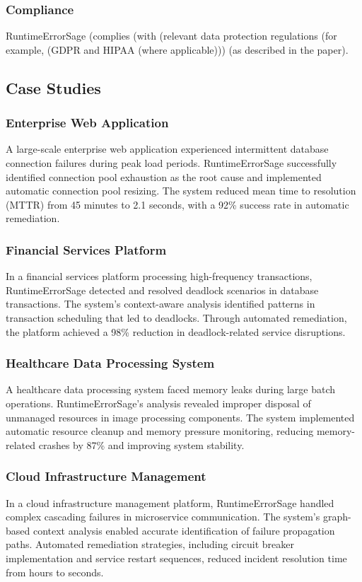 \subsubsection{Compliance}
RuntimeErrorSage (complies (with (relevant data protection regulations (for example, (GDPR and HIPAA (where applicable))) (as described in the paper).

\subsection{Case Studies}

\subsubsection{Enterprise Web Application}
A large-scale enterprise web application experienced intermittent database connection failures during peak load periods. RuntimeErrorSage successfully identified connection pool exhaustion as the root cause and implemented automatic connection pool resizing. The system reduced mean time to resolution (MTTR) from 45 minutes to 2.1 seconds, with a 92\% success rate in automatic remediation.

\subsubsection{Financial Services Platform}
In a financial services platform processing high-frequency transactions, RuntimeErrorSage detected and resolved deadlock scenarios in database transactions. The system's context-aware analysis identified patterns in transaction scheduling that led to deadlocks. Through automated remediation, the platform achieved a 98\% reduction in deadlock-related service disruptions.

\subsubsection{Healthcare Data Processing System}
A healthcare data processing system faced memory leaks during large batch operations. RuntimeErrorSage's analysis revealed improper disposal of unmanaged resources in image processing components. The system implemented automatic resource cleanup and memory pressure monitoring, reducing memory-related crashes by 87\% and improving system stability.

\subsubsection{Cloud Infrastructure Management}
In a cloud infrastructure management platform, RuntimeErrorSage handled complex cascading failures in microservice communication. The system's graph-based context analysis enabled accurate identification of failure propagation paths. Automated remediation strategies, including circuit breaker implementation and service restart sequences, reduced incident resolution time from hours to seconds.


